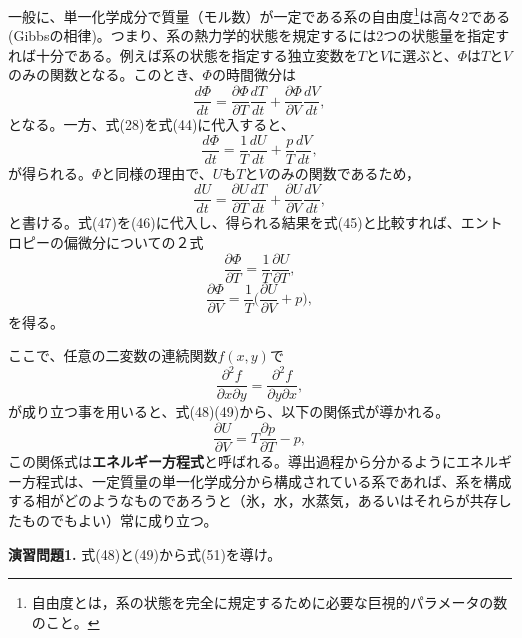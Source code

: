 \documentclass{jsarticle}
\begin{document}
一般に、単一化学成分で質量（モル数）が一定である系の自由度\footnote{自由度とは，系の状態を完全に規定するために必要な巨視的パラメータの数のこと。}は高々2である(Gibbsの相律)。つまり、系の熱力学的状態を規定するには2つの状態量を指定すれば十分である。例えば系の状態を指定する独立変数を$T$と$V$に選ぶと、$\Phi$は$T$と$V$のみの関数となる。このとき、$\Phi$の時間微分は
\begin{equation}
 \frac{d\Phi}{dt}=\frac{\partial \Phi}{\partial T}\frac{dT}{dt}+\frac{\partial \Phi}{\partial V}\frac{dV}{dt},
\end{equation}
となる。一方、式(28)を式(44)に代入すると、
\begin{equation}
 \frac{d\Phi}{dt}=\frac{1}{T}\frac{dU}{dt}+\frac{p}{T}\frac{dV}{dt},
\end{equation}
が得られる。$\Phi$と同様の理由で、$U$も$T$と$V$のみの関数であるため，
\begin{equation}
 \frac{dU}{dt}=\frac{\partial U}{\partial T}\frac{dT}{dt}+\frac{\partial U}{\partial V}\frac{dV}{dt},
\end{equation}
と書ける。式(47)を(46)に代入し、得られる結果を式(45)と比較すれば、エントロピーの偏微分についての２式
\begin{equation}
 \frac{\partial \Phi}{\partial T}=\frac{1}{T}\frac{\partial U}{\partial T},
\end{equation}
\begin{equation}
 \frac{\partial \Phi}{\partial V}=\frac{1}{T}{\bigg (}\frac{\partial U}{\partial V}+p{\bigg )},
\end{equation}
を得る。

ここで、任意の二変数の連続関数$f(x,y)$で
\begin{equation}
 \frac{\partial^{2} f}{\partial x \partial y}=\frac{\partial^{2} f}{\partial y \partial x},
\end{equation}
が成り立つ事を用いると、式(48)(49)から、以下の関係式が導かれる。
\begin{equation}
 \frac{\partial U}{\partial V}=T\frac{\partial p}{\partial T}-p,
\end{equation}
この関係式は{\bf エネルギー方程式}と呼ばれる。導出過程から分かるようにエネルギー方程式は、一定質量の単一化学成分から構成されている系であれば、系を構成する相がどのようなものであろうと（氷，水，水蒸気，あるいはそれらが共存したものでもよい）常に成り立つ。
\\
\begin{itembox}[l]{\bf{演習問題1.}}
式(48)と(49)から式(51)を導け。
\end{itembox}
\end{document}
